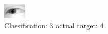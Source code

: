 \begin{figure}[h!]
\begin{center}
\includegraphics[width=0.60\columnwidth]{figures/ID2411_class_3_target_4.png}
\end{center}
\caption{ Classification: 3 actual target: 4}
\label{fig:ID2411_class_3_target_4}
\end{figure}
